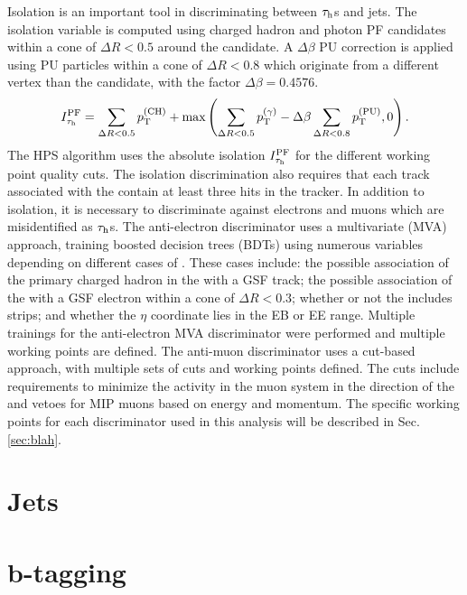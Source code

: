 Isolation is an important tool in discriminating between $\tau_{\text{h}}$s and jets. The isolation variable is computed using charged hadron and photon PF candidates within a cone of $\Delta R < 0.5$ around the \tauh candidate. A $\Delta\beta$ PU correction is applied using PU particles within a cone of $\Delta R < 0.8$ which originate from a different vertex than the \tauh candidate, with the factor $\Delta\beta = 0.4576$.
\begin{equation}
I^{\text{PF}}_{\tau_{\text{h}}} = \sum_{\Delta R < 0.5}{p_{\mathrm{T}}^{(\text{CH})}} + \text{max}\left( \sum_{\Delta R < 0.5}{p_{\mathrm{T}}^{(\gamma)}} - \Delta\beta \sum_{\Delta R < 0.8}{p_{\mathrm{T}}^{(\text{PU})}}, 0 \right).
\end{equation}
The HPS algorithm uses the absolute isolation $I^{\text{PF}}_{\tau_{\text{h}}}$ for the different working point quality cuts. The isolation discrimination also requires that each track associated with the \tauh contain at least three hits in the tracker. In addition to isolation, it is necessary to discriminate against electrons and muons which are misidentified as $\tau_{\text{h}}$s. The anti-electron discriminator uses a multivariate (MVA) approach, training boosted decision trees (BDTs) using numerous variables depending on different cases of \tauh. These cases include: the possible association of the primary charged hadron in the \tauh with a GSF track; the possible association of the \tauh with a GSF electron within a cone of $\Delta R < 0.3$; whether or not the \tauh includes strips; and whether the \tauh $\eta$ coordinate lies in the EB or EE range. Multiple trainings for the anti-electron MVA discriminator were performed and multiple working points are defined. The anti-muon discriminator uses a cut-based approach, with multiple sets of cuts and working points defined. The cuts include requirements to minimize the activity in the muon system in the direction of the \tauh and vetoes for MIP muons based on energy and momentum. The specific working points for each discriminator used in this analysis will be described in Sec. \ref{sec:blah}.

\section{Jets}

\section{b-tagging}